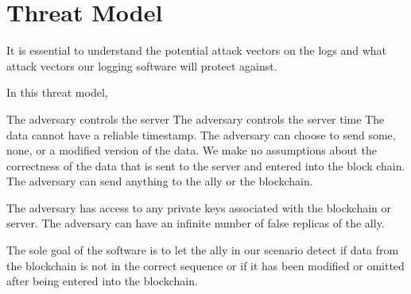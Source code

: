 \label{threats}
\section{Threat Model}
It is essential to understand the potential attack vectors on the logs and what attack vectors our logging software will protect against.

        In this threat model, 
        \begin{outline}
            \1   The adversary controls the server
            \1   The adversary controls the server time
                \2  The data cannot have a reliable timestamp.
            \1   The adversary can choose to send some, none, or a modified version of the data.
                \2         We make no assumptions about the correctness of the data that is sent to the server and entered into the block chain.
            \1   The adversary can send anything to the ally or the blockchain.
                
            \1 The adversary has access to any private keys associated with the blockchain or server.
            \1 The adversary can have an infinite number of false replicas of the ally.
        \end{outline}

        The sole goal of the software is to let the ally in our scenario detect if data from the blockchain is not in the correct sequence or if it has been modified or omitted after being entered into the blockchain. 

